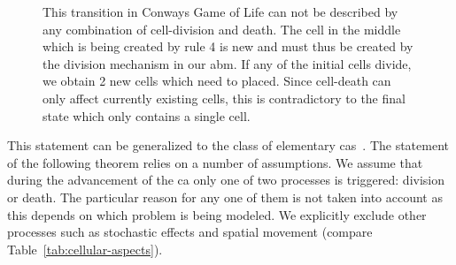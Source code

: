 \begin{figure}[h]
    \centering
    \caption{
        This transition in Conways Game of Life can not be described by any combination of
        cell-division and death.
        The cell in the middle which is being created by rule 4 is new and must thus be created by
        the division mechanism in our \ac{abm}.
        If any of the initial cells divide, we obtain 2 new cells which need to placed.
        Since cell-death can only affect currently existing cells, this is contradictory to the
        final state which only contains a single cell.
    }
    \label{fig:conway-non-abm-transition}
\end{figure}

This statement can be generalized to the class of elementary \acp{ca}~\cite{Wolfram1983}.
The statement of the following theorem relies on a number of assumptions.
We assume that during the advancement of the \ac{ca} only one of two processes is triggered:
division or death.
The particular reason for any one of them is not taken into account as this depends on which
problem is being modeled.
We explicitly exclude other processes such as stochastic effects and spatial movement
(compare Table~\ref{tab:cellular-aspects}).

